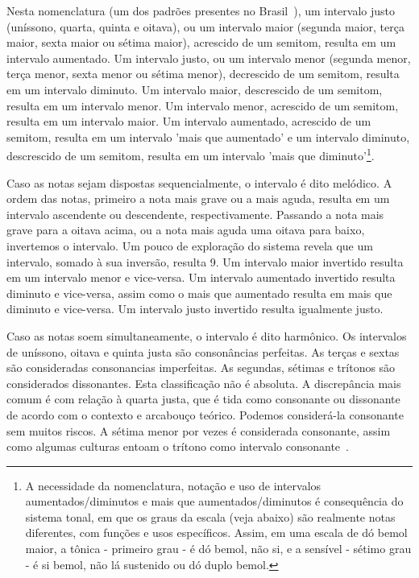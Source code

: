 Nesta nomenclatura (um dos padrões presentes no Brasil~\cite{Lacerda}),
um intervalo justo (uníssono, quarta, quinta e oitava), ou um intervalo maior (segunda maior, terça maior, sexta maior ou sétima maior), acrescido de um semitom, resulta em um intervalo aumentado. Um intervalo justo, ou um intervalo menor (segunda menor, terça menor, sexta menor ou sétima menor), decrescido de um semitom, resulta em um intervalo diminuto. Um intervalo maior, descrescido de um semitom,
resulta em um intervalo menor. Um intervalo menor, acrescido de um semitom, resulta em um intervalo maior. Um intervalo aumentado, acrescido de um semitom, resulta em um intervalo 'mais que aumentado' e um intervalo diminuto, descrescido de um semitom, resulta em um intervalo 'mais que diminuto'\footnote{A
 necessidade da nomenclatura, notação e uso de intervalos aumentados/diminutos e mais que aumentados/diminutos é consequência do sistema tonal, em que os graus da escala (veja abaixo) são realmente notas diferentes, com funções e usos específicos. Assim, em uma escala de dó bemol maior, a tônica - primeiro grau - é dó bemol, não si, e a sensível - sétimo grau - é si bemol, não lá sustenido ou dó duplo bemol.}. 

Caso as notas sejam dispostas sequencialmente, o intervalo é dito melódico. A ordem das notas, primeiro a nota mais grave ou a mais aguda, resulta em um intervalo ascendente ou descendente, respectivamente. 
Passando a nota mais grave para a oitava acima, ou a nota mais aguda uma oitava para baixo, invertemos o intervalo. Um pouco de exploração do sistema revela que um intervalo, somado à sua inversão, resulta 9. Um intervalo maior invertido resulta em um intervalo menor e vice-versa. Um intervalo aumentado invertido resulta diminuto e vice-versa, assim como o mais que aumentado resulta em mais que diminuto e vice-versa. Um intervalo justo invertido resulta igualmente justo.


Caso as notas soem simultaneamente, o intervalo é dito harmônico. Os intervalos de uníssono, oitava e quinta justa são consonâncias perfeitas. As terças e sextas são consideradas consonancias imperfeitas. As segundas, sétimas e trítonos são considerados dissonantes. Esta classificação não é absoluta. A discrepância mais comum é com relação à quarta justa, que é tida como consonante ou dissonante de acordo com o contexto e arcabouço teórico. Podemos considerá-la consonante sem muitos riscos. A sétima menor por vezes é considerada consonante, assim como algumas culturas entoam o trítono como intervalo consonante~\cite{Roederer,Wisnick}.

